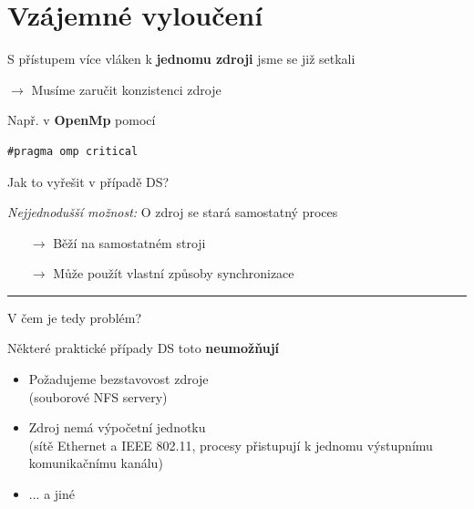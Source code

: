 \documentclass[usenames,dvipsnames,9pt]{beamer}
\begin{document}
\section{Vzájemné vyloučení}

\begin{frame}[fragile]

S přístupem více vláken k {\bf jednomu zdroji} jsme se již setkali

\hfill $\rightarrow$ Musíme zaručit konzistenci zdroje

\vspace{1em}

\begin{minipage}{0.4\linewidth}
Např. v {\bf OpenMp} pomocí
\end{minipage}
\begin{minipage}{0.4\linewidth}
\begin{verbatim}
#pragma omp critical
\end{verbatim}
\end{minipage}

 \vspace{2em}\pause

  \begin{center}
    \LARGE Jak to vyřešit v případě DS?
  \end{center}


\end{frame}

\begin{frame}

\textit{Nejjednodušší možnost:} \large O zdroj se stará samostatný proces

\begin{itemize}
\item[$\rightarrow$] Běží na samostatném stroji
\item[$\rightarrow$] Může použít vlastní způsoby synchronizace
\end{itemize}

  \pause\vspace{1em}\hrule\vspace{1em}

  \begin{center}
    \LARGE V čem je tedy problém?
  \end{center}

\vspace{1em}\pause

Některé praktické případy DS toto {\bf neumožňují}


  \begin{itemize}
    \item Požadujeme bezstavovost zdroje \\
          {\small (souborové NFS servery)}
    \item Zdroj nemá výpočetní jednotku \\
          {\small (sítě Ethernet a IEEE 802.11, procesy přistupují k jednomu výstupnímu komunikačnímu kanálu)}
    \item ... a jiné
  \end{itemize}


\end{frame}
\end{document}
